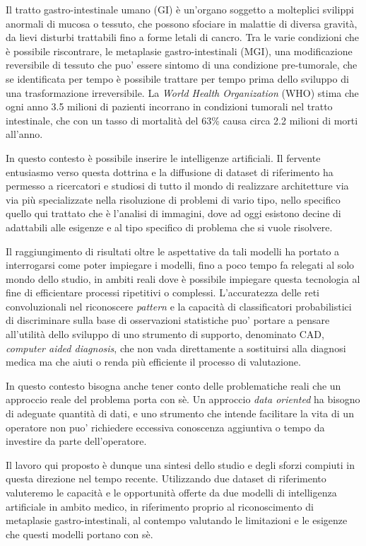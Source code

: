 Il tratto gastro-intestinale umano (GI) è un'organo soggetto a
molteplici svilippi anormali di mucosa o tessuto, che possono
sfociare in malattie di diversa gravità, da lievi disturbi trattabili
fino a forme letali di cancro.
Tra le varie condizioni che è possibile riscontrare, le metaplasie
gastro-intestinali (MGI), una modificazione reversibile di tessuto
che puo' essere sintomo di una condizione pre-tumorale, che
se identificata per tempo è possibile trattare per tempo
prima dello sviluppo di una trasformazione irreversibile.
La {\it World Health Organization} (WHO) stima che ogni anno
3.5 milioni di pazienti incorrano in condizioni tumorali
nel tratto intestinale, che con un tasso di mortalità del
63\% causa circa 2.2 milioni di morti all'anno.

In questo contesto è possibile inserire le intelligenze artificiali.
Il fervente entusiasmo verso questa dottrina e la diffusione
di dataset di riferimento ha permesso a ricercatori e studiosi
di tutto il mondo di realizzare architetture via via più
specializzate nella risoluzione di problemi di vario tipo,
nello specifico quello qui trattato che è l'analisi di immagini,
dove ad oggi esistono decine di adattabili alle esigenze e al tipo
specifico di problema che si vuole risolvere.

Il raggiungimento di risultati oltre le aspettative
da tali modelli ha portato a interrogarsi come poter impiegare
i modelli, fino a poco tempo fa relegati al solo mondo dello studio,
in ambiti reali dove è possibile impiegare questa tecnologia al fine
di efficientare processi ripetitivi o complessi.
L'accuratezza delle reti convoluzionali nel riconoscere {\it pattern}
e la capacità di classificatori probabilistici di discriminare
sulla base di osservazioni statistiche puo' portare a pensare
all'utilità dello sviluppo di uno strumento di supporto,
denominato CAD, {\it computer aided diagnosis}, che non vada
direttamente a sostituirsi alla diagnosi medica ma che aiuti
o renda più efficiente il processo di valutazione.

In questo contesto bisogna anche tener conto delle problematiche
reali che un approccio reale del problema porta con sè.
Un approccio {\it data oriented} ha bisogno di adeguate
quantità di dati, e uno strumento che intende facilitare la vita
di un operatore non puo' richiedere eccessiva conoscenza
aggiuntiva o tempo da investire da parte dell'operatore.

Il lavoro qui proposto è dunque una sintesi dello studio
e degli sforzi compiuti in questa direzione nel tempo recente.
Utilizzando due dataset di riferimento valuteremo le capacità
e le opportunità offerte da due modelli di intelligenza artificiale
in ambito medico, in riferimento proprio al riconoscimento
di metaplasie gastro-intestinali, al contempo valutando
le limitazioni e le esigenze che questi modelli portano con sè.

